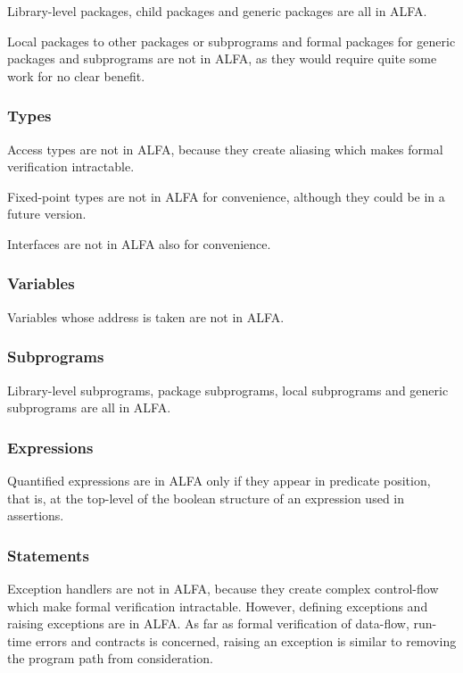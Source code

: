 \documentclass{article}
\begin{document}
Library-level packages, child packages and generic packages are all in ALFA.

Local packages to other packages or subprograms and formal packages for generic
packages and subprograms are not in ALFA, as they would require quite some work
for no clear benefit.

\subsubsection{Types}

Access types are not in ALFA, because they create aliasing which makes formal
verification intractable.

Fixed-point types are not in ALFA for convenience, although they could be in a
future version.

Interfaces are not in ALFA also for convenience.

\subsubsection{Variables}

Variables whose address is taken are not in ALFA.

\subsubsection{Subprograms}

Library-level subprograms, package subprograms, local subprograms and generic
subprograms are all in ALFA.

\subsubsection{Expressions}

Quantified expressions are in ALFA only if they appear in predicate position,
that is, at the top-level of the boolean structure of an expression used in
assertions.

\subsubsection{Statements}

Exception handlers are not in ALFA, because they create complex control-flow
which make formal verification intractable. However, defining exceptions and
raising exceptions are in ALFA. As far as formal verification of data-flow,
run-time errors and contracts is concerned, raising an exception is similar to
removing the program path from consideration.
\end{document}
